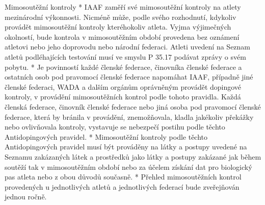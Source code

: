 Mimosoutěžní kontroly
* IAAF zaměří své mimosoutěžní kontroly na atlety mezinárodní výkonnosti. Nicméně může, podle svého rozhodnutí, kdykoliv provádět mimosoutěžní kontroly kteréhokoliv atleta. Vyjma výjimečných okolností, bude kontrola v mimosoutěžním období provedena bez oznámení atletovi nebo jeho doprovodu nebo národní federaci. Atleti uvedení na Seznam atletů podléhajících testování musí ve smyslu P 35.17 podávat zprávy o svém pobytu.
* Je povinností každé členské federace, činovníka členské federace a ostatních osob pod pravomocí členské federace napomáhat IAAF, případně jiné členské federaci, WADA a dalším orgánům oprávněným provádět dopingové kontroly, v provádění mimosoutěžních kontrol podle tohoto pravidla. Každá členská federace, činovník členské federace nebo jiná osoba pod pravomocí členské federace, která by bránila v provádění, znemožňovala, kladla jakékoliv překážky nebo ovlivňovala kontroly, vystavuje se nebezpečí postihu podle těchto Antidopingových pravidel.
* Mimosoutěžní kontroly podle těchto Antidopingových pravidel musí být prováděny na látky a postupy uvedené na Seznamu zakázaných látek a prostředků jako látky a postupy zakázané jak během soutěží tak v mimosoutěžním období nebo za účelem získání dat pro biologický pas atleta nebo z obou důvodů současně.
* Přehled mimosoutěžních kontrol provedených u jednotlivých atletů a jednotlivých federací bude zveřejňován jednou ročně.

